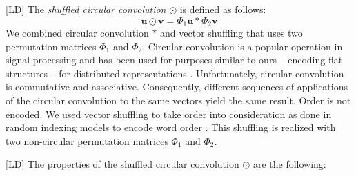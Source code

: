 \documentclass[twoside,11pt]{article}
\def\vec#1{\mathbf{#1}}
\def\smallvectors#1{\mathcal{#1}}
\def\R{\mathbb{R}}
\def\df{\Upsilon}
\def\mo{\odot}
\def\cconv{\ast}
\newcounter{properties}
\def\mysecondremove#1{}
\def\mysecondinsert#1{#1}
\def\LD#1{[{\color{blue}L}D] {\color{blue}#1}}
\begin{document}




\LD{The \emph{shuffled circular convolution} $\mo$ is defined as follows:
$$
\vec u \mo \vec v = \Phi_1 \vec u \cconv \Phi_2 \vec v
$$}
We combined circular convolution $\cconv$ and vector shuffling that uses two permutation matrices $\Phi_1$ and $\Phi_2$. 
Circular convolution is a popular operation in signal processing and has been used for purposes similar to ours -- encoding flat structures -- for distributed representations \cite{Plate1995}. 
Unfortunately, circular convolution is commutative and associative. Consequently, different sequences of applications of the circular convolution to the same vectors yield the same result. Order is not encoded. We used vector shuffling to take order into consideration as done in random indexing models to encode word order \cite{Sahlgren:premutations:2008}. This shuffling is realized with two non-circular permutation matrices $\Phi_1$ and $\Phi_2$. 


\LD{The  properties of the shuffled circular convolution $\mo$ are the following:} 
\end{document}

